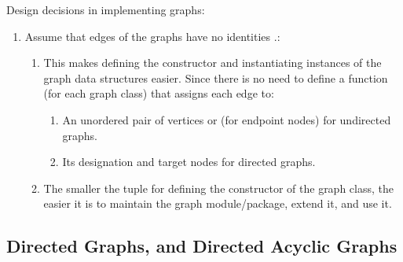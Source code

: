 Design decisions in implementing graphs: \vspace{-0.3cm}
\begin{enumerate} \itemsep -4pt
\item Assume that edges of the graphs have no identities \cite{WikipediaContributors2018a39}.: \vspace{-0.3cm}
	\begin{enumerate} \itemsep -2pt
	\item This makes defining the constructor and instantiating instances of the graph data structures easier. Since there is no need to define a function (for each graph class) that assigns each edge to: \vspace{-0.2cm}
		\begin{enumerate} \itemsep -2pt
		\item An unordered pair of vertices or (for endpoint nodes) for undirected graphs.
		\item Its designation and target nodes for directed graphs.
		\end{enumerate}
	\item The smaller the tuple for defining the constructor of the graph class, the easier it is to maintain the graph module/package, extend it, and use it.
	\end{enumerate}
\end{enumerate}




\subsection{Directed Graphs, and Directed Acyclic Graphs}
\label{ssec:DirectedGraphsAndDirectedAcyclicGraphs}


